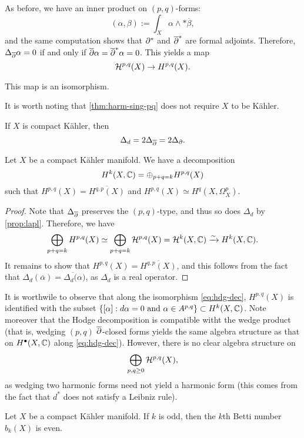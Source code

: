 As before, we have an inner product on $(p,q)$-forms:
\[
(\alpha,\beta):=\int_X\alpha\wedge *\overline\beta,
\]
and the same computation shows that $\partial^*$ and ${\overline\partial}^*$ are formal adjoints. Therefore, $\Delta_{\overline\partial}\alpha=0$ if and only if ${\overline\partial}\alpha={\overline\partial}^*\alpha=0$. This yields a map
\[
\mathcal{H}^{p,q}(X)\to H^{p,q}(X).
\]
\begin{theorem}\label{thm:harm-sing-pq}
This map is an isomorphism.
\end{theorem}
It is worth noting that \autoref{thm:harm-sing-pq} does not require $X$ to be Kähler.
%
\begin{proposition}\label{prop:lapl}
	If $X$ is compact Kähler, then 
	\[
	\Delta_d=2\Delta_{\overline\partial}=2\Delta_\partial.
	\]
\end{proposition}
%
\begin{corollary}
	Let $X$ be a compact Kähler manifold. We have a decomposition
	\[
	H^k(X,\mathbb C)=\oplus_{p+q=k}H^{p,q}(X)
	\]
	such that $H^{p,q}(X)=\overline{H^{q,p}(X)}$ and $H^{p,q}(X)\simeq H^q(X,\Omega_X^p)$.
\end{corollary}
%
\begin{proof}
	Note that $\Delta_{\overline\partial}$ preserves the $(p,q)$-type, and thus so does $\Delta_d$ by \autoref{prop:lapl}. Therefore, we have
	\begin{equation}
	\bigoplus_{p+q=k} H^{p,q}(X)\simeq \bigoplus_{p+q=k}\mathcal{H}^{p,q}(X)=\mathcal{H}^k(X,\mathbb C)\xrightarrow{\sim}H^k(X,\mathbb C).\label{eq:hdg-dec}
	\end{equation}
	It remains to show that $H^{p,q}(X)=\overline{H^{q,p}(X)}$, and this follows from the fact that $\Delta_d(\overline\alpha)=\overline{\Delta_d(\alpha})$, as $\Delta_d$ is a real operator.
\end{proof}
	
\begin{remark}
It is worthwile to observe that along the isomorphism \eqref{eq:hdg-dec}, $H^{p,q}(X)$ is identified with the subset $\{[\alpha]: d\alpha=0 \text{ and } \alpha\in A^{p,q}\}\subset H^k(X,\mathbb C)$. Note moreover that the Hodge decomposition is compatible witht the wedge product (that is, wedging $(p,q)$ ${\overline\partial}$-closed forms yields the same algebra structure as that on $H^\bullet(X,\mathbb C)$ along \eqref{eq:hdg-dec}). However, there is no clear algebra structure on
\[
\bigoplus_{p,q\geq 0}\mathcal{H}^{p,q}(X),
\]
as wedging two harmonic forms need not yield a harmonic form (this comes from the fact that $d^*$ does not satisfy a Leibniz rule).
\end{remark}

\begin{corollary}
	Let $X$ be a compact Kähler manifold. If $k$ is odd, then the $k$th Betti number $b_k(X)$ is even.
\end{corollary}	
	
